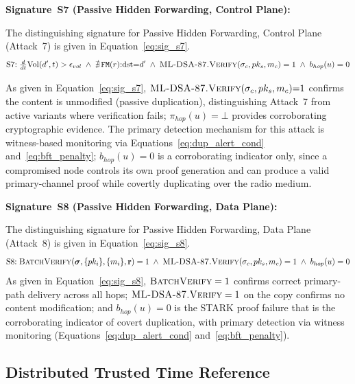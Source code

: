 \documentclass[12pt, a4paper]{report}
\begin{document}
\textbf{Signature~S7 (Passive Hidden Forwarding, Control Plane):}

The distinguishing signature for Passive Hidden
Forwarding, Control Plane (Attack~7) is given in
Equation~\eqref{eq:sig_s7}.
\begin{equation}
\text{S7:}\;
\tfrac{d}{dt}\text{Vol}(d',t) > \epsilon_{vol}
\;\land\; \nexists\,\texttt{FM}(r){:}\text{dst}{=}d'
\;\land\; \textsc{ML-DSA-87.Verify}(
\sigma_c, pk_s, m_c) = 1
\;\land\; b_{hop}(u) = 0
\label{eq:sig_s7}
\end{equation}

As given in Equation~\eqref{eq:sig_s7},
$\textsc{ML-DSA-87.Verify}(\sigma_c, pk_s, m_c){=}1$
confirms the content is unmodified (passive duplication),
distinguishing Attack~7 from active variants where
verification fails; $\pi_{hop}(u){=}\bot$ provides
corroborating cryptographic evidence. The primary
detection mechanism for this attack is witness-based
monitoring via Equations~\eqref{eq:dup_alert_cond}
and~\eqref{eq:bft_penalty}; $b_{hop}(u){=}0$ is a
corroborating indicator only, since a compromised node
controls its own proof generation and can produce a
valid primary-channel proof while covertly duplicating
over the radio medium.




\textbf{Signature~S8 (Passive Hidden Forwarding, Data Plane):}


The distinguishing signature for Passive Hidden
Forwarding, Data Plane (Attack~8) is given in
Equation~\eqref{eq:sig_s8}.
\begin{equation}
\text{S8:}\;
\textsc{BatchVerify}(\boldsymbol{\sigma},
\{pk_i\}, \{m_i\}, \mathbf{r}) = 1
\;\land\; \textsc{ML-DSA-87.Verify}(
\sigma_c, pk_s, m_c) = 1
\;\land\; b_{hop}(u) = 0
\label{eq:sig_s8}
\end{equation}
As given in Equation~\eqref{eq:sig_s8},
$\textsc{BatchVerify} = 1$ confirms correct
primary-path delivery across all hops;
$\textsc{ML-DSA-87.Verify} = 1$ on the copy
confirms no content modification; and
$b_{hop}(u) = 0$ is the \ac{STARK} proof failure
that is the corroborating indicator of covert
duplication, with primary detection via witness
monitoring (Equations~\eqref{eq:dup_alert_cond}
and~\eqref{eq:bft_penalty}).


\subsection{Distributed Trusted Time Reference}
\label{sec:time_ref}
\end{document}
